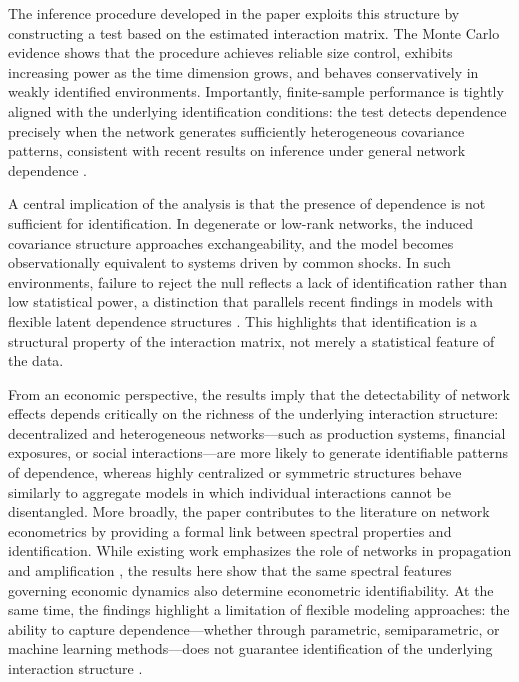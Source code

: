 \documentclass[12pt]{article}
\numberwithin{equation}{section}
\begin{document}
The inference procedure developed in the paper exploits this structure by constructing a test based on the estimated interaction matrix. The Monte Carlo evidence shows that the procedure achieves reliable size control, exhibits increasing power as the time dimension grows, and behaves conservatively in weakly identified environments. Importantly, finite-sample performance is tightly aligned with the underlying identification conditions: the test detects dependence precisely when the network generates sufficiently heterogeneous covariance patterns, consistent with recent results on inference under general network dependence \citep{jiang2025networkclt}.

A central implication of the analysis is that the presence of dependence is not sufficient for identification. In degenerate or low-rank networks, the induced covariance structure approaches exchangeability, and the model becomes observationally equivalent to systems driven by common shocks. In such environments, failure to reject the null reflects a lack of identification rather than low statistical power, a distinction that parallels recent findings in models with flexible latent dependence structures \citep{ghosh2024identifiability}. This highlights that identification is a structural property of the interaction matrix, not merely a statistical feature of the data.

From an economic perspective, the results imply that the detectability of network effects depends critically on the richness of the underlying interaction structure: decentralized and heterogeneous networks—such as production systems, financial exposures, or social interactions—are more likely to generate identifiable patterns of dependence, whereas highly centralized or symmetric structures behave similarly to aggregate models in which individual interactions cannot be disentangled. More broadly, the paper contributes to the literature on network econometrics by providing a formal link between spectral properties and identification. While existing work emphasizes the role of networks in propagation and amplification \citep{acemoglu2012network, acemoglu2015systemic, elliott2014financial}, the results here show that the same spectral features governing economic dynamics also determine econometric identifiability. At the same time, the findings highlight a limitation of flexible modeling approaches: the ability to capture dependence—whether through parametric, semiparametric, or machine learning methods—does not guarantee identification of the underlying interaction structure \citep{zhou2025neuralfrailty}.
\end{document}
